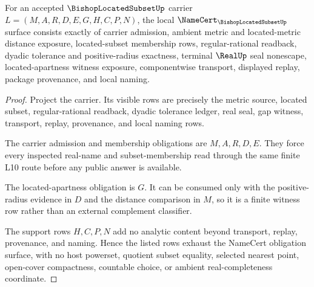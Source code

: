 \begin{theorem}
\label{thm:bishop-located-subset-namecert-obligations}
For an accepted $\BishopLocatedSubsetUp$ carrier $L=(M,A,R,D,E,G,H,C,P,N)$, the local $\NameCert_{\BishopLocatedSubsetUp}$ surface consists exactly of carrier admission, ambient metric and located-metric distance exposure, located-subset membership rows, regular-rational readback, dyadic tolerance and positive-radius exactness, terminal $\RealUp$ seal nonescape, located-apartness witness exposure, componentwise transport, displayed replay, package provenance, and local naming.
\end{theorem}
\begin{proof}
Project the carrier. Its visible rows are precisely the metric source, located subset, regular-rational readback, dyadic tolerance ledger, real seal, gap witness, transport, replay, provenance, and local naming rows.

The carrier admission and membership obligations are $M,A,R,D,E$. They force every inspected real-name and subset-membership read through the same finite L10 route before any public answer is available.

The located-apartness obligation is $G$. It can be consumed only with the positive-radius evidence in $D$ and the distance comparison in $M$, so it is a finite witness row rather than an external complement classifier.

The support rows $H,C,P,N$ add no analytic content beyond transport, replay, provenance, and naming. Hence the listed rows exhaust the NameCert obligation surface, with no host powerset, quotient subset equality, selected nearest point, open-cover compactness, countable choice, or ambient real-completeness coordinate.
\end{proof}



